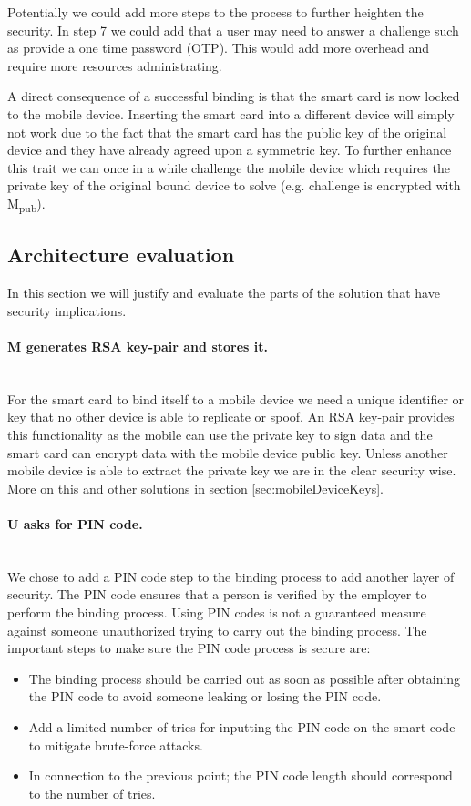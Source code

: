 Potentially we could add more steps to the process to further heighten the security. In step 7 we could add that a user may need to answer a challenge such as provide a one time password (OTP). This would add more overhead and require more resources administrating.

A direct consequence of a successful binding is that the smart card is now locked to the mobile device. Inserting the smart card into a different device will simply not work due to the fact that the smart card has the public key of the original device and they have already agreed upon a symmetric key. To further enhance this trait we can once in a while challenge the mobile device which requires the private key of the original bound device to solve (e.g. challenge is encrypted with M\textsubscript{pub}).

\subsection{Architecture evaluation}
In this section we will justify and evaluate the parts of the solution that have security implications.

\paragraph{M generates RSA key-pair and stores it.}\mbox{}\\
For the smart card to bind itself to a mobile device we need a unique identifier or key that no other device is able to replicate or spoof. An RSA key-pair provides this functionality as the mobile can use the private key to sign data and the smart card can encrypt data with the mobile device public key. Unless another mobile device is able to extract the private key we are in the clear security wise. More on this and other solutions in section \ref{sec:mobileDeviceKeys}.

\paragraph{U asks for PIN code.}\mbox{}\\
We chose to add a PIN code step to the binding process to add another layer of security. The PIN code ensures that a person is verified by the employer to perform the binding process. Using PIN codes is not a guaranteed measure against someone unauthorized trying to carry out the binding process. The important steps to make sure the PIN code process is secure are:
\begin{itemize}
  \item The binding process should be carried out as soon as possible after obtaining the PIN code to avoid someone leaking or losing the PIN code.
  \item Add a limited number of tries for inputting the PIN code on the smart code to mitigate brute-force attacks.
  \item In connection to the previous point; the PIN code length should correspond to the number of tries.
\end{itemize}


